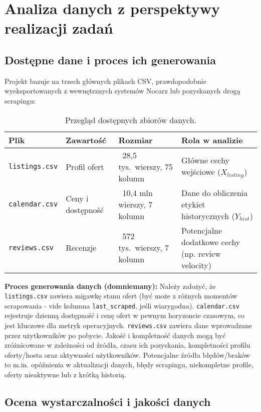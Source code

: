 \documentclass[a4paper,11pt]{article}
\begin{document}
\clearpage

\section{Analiza danych z perspektywy realizacji zadań}

\subsection{Dostępne dane i proces ich generowania}

Projekt bazuje na trzech głównych plikach CSV, prawdopodobnie wyeksportowanych z wewnętrznych systemów Nocarz lub pozyskanych drogą scrapingu:

\begin{table}[h]
\centering
\begin{tabular}{@{}llll@{}}
\toprule
\textbf{Plik} & \textbf{Zawartość} & \textbf{Rozmiar} & \textbf{Rola w analizie} \\
\midrule
\texttt{listings.csv}  & Profil ofert         & ~28,5 tys.\ wierszy, 75 kolumn & Główne cechy wejściowe ($X_{listing}$) \\
\texttt{calendar.csv}  & Ceny i dostępność    & ~10,4 mln wierszy, 7 kolumn   & Dane do obliczenia etykiet historycznych ($Y_{hist}$) \\
\texttt{reviews.csv}   & Recenzje             & ~572 tys.\ wierszy, 7 kolumn  & Potencjalne dodatkowe cechy (np. review velocity) \\
\bottomrule
\end{tabular}
\caption{Przegląd dostępnych zbiorów danych.}
\label{tab:datasets}
\end{table}

\textbf{Proces generowania danych (domniemany):} Należy założyć, że \texttt{listings.csv} zawiera migawkę stanu ofert (być może z różnych momentów scrapowania - vide kolumna \texttt{last\_scraped}, jeśli wiarygodna). \texttt{calendar.csv} rejestruje dzienną dostępność i cenę ofert w pewnym horyzoncie czasowym, co jest kluczowe dla metryk operacyjnych. \texttt{reviews.csv} zawiera dane wprowadzane przez użytkowników po pobycie. Jakość i kompletność danych mogą być zróżnicowane w zależności od źródła, czasu ich pozyskania, kompletności profilu oferty/hosta oraz aktywności użytkowników. Potencjalne źródła błędów/braków to m.in. opóźnienia w aktualizacji danych, błędy scrapingu, niekompletne profile, oferty nieaktywne lub z krótką historią.

\subsection{Ocena wystarczalności i jakości danych}
\end{document}
